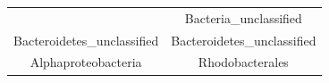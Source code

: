 \documentclass[]{article}
\begin{document}
\begin{longtable}[]{@{}cc@{}}
\begin{minipage}[t]{0.38\columnwidth}
\end{minipage} & \begin{minipage}[t]{0.38\columnwidth}\centering\strut
Bacteria\_unclassified\strut
\end{minipage}\tabularnewline
\begin{minipage}[t]{0.38\columnwidth}\centering\strut
Bacteroidetes\_unclassified\strut
\end{minipage} & \begin{minipage}[t]{0.38\columnwidth}\centering\strut
Bacteroidetes\_unclassified\strut
\end{minipage}\tabularnewline
\begin{minipage}[t]{0.38\columnwidth}\centering\strut
Alphaproteobacteria\strut
\end{minipage} & \begin{minipage}[t]{0.38\columnwidth}\centering\strut
Rhodobacterales\strut
\end{minipage}\tabularnewline
\bottomrule
\end{longtable}
\end{document}
